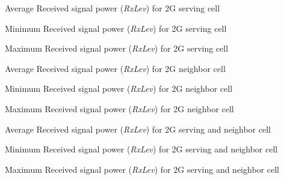 %
{Average Received signal power (\textit{RxLev}) for 2G serving cell}

%
{Minimum Received signal power (\textit{RxLev}) for 2G serving cell}

%
{Maximum Received signal power (\textit{RxLev}) for 2G serving cell}


%
{Average Received signal power (\textit{RxLev}) for 2G neighbor cell}

%
{Minimum Received signal power (\textit{RxLev}) for 2G neighbor cell}

%
{Maximum Received signal power (\textit{RxLev}) for 2G neighbor cell}


%
{Average Received signal power (\textit{RxLev}) for 2G serving and neighbor cell}

%
{Minimum Received signal power (\textit{RxLev}) for 2G serving and neighbor cell}

%
{Maximum Received signal power (\textit{RxLev}) for 2G serving and neighbor cell}


